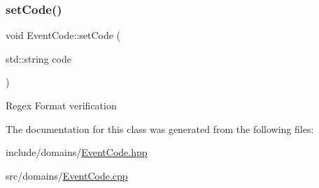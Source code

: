 \subsubsection{\texorpdfstring{setCode()}{setCode()}}
{\footnotesize\ttfamily void Event\+Code\+::set\+Code (\begin{DoxyParamCaption}\item[{std\+::string}]{code }\end{DoxyParamCaption})}

Regex Format verification 

The documentation for this class was generated from the following files\+:\begin{DoxyCompactItemize}
\item 
include/domains/\mbox{\hyperlink{_event_code_8hpp}{Event\+Code.\+hpp}}\item 
src/domains/\mbox{\hyperlink{_event_code_8cpp}{Event\+Code.\+cpp}}\end{DoxyCompactItemize}
